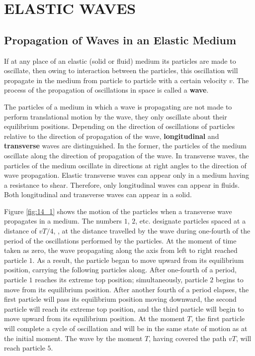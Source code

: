 

\chapter[ELASTIC WAVES]{ELASTIC WAVES}\label{chap:14}

\section{Propagation of Waves in an Elastic Medium}\label{sec:14_1}

If at any place of an elastic (solid or fluid) medium its particles are made to oscillate, then owing to interaction between the particles, this oscillation will propagate in the medium from particle to particle with a certain velocity $v$.
The process of the propagation of oscillations in space is called a \textbf{wave}.

The particles of a medium in which a wave is propagating are not made to perform translational motion by the wave, they only oscillate about their equilibrium positions.
Depending on the direction of oscillations of particles relative to the direction of propagation of the wave, \textbf{longitudinal} and \textbf{transverse} waves are distinguished.
In the former, the particles of the medium oscillate along the direction of propagation of the wave.
In transverse waves, the particles of the medium oscillate in directions at right angles to the direction of wave propagation.
Elastic transverse waves can appear only in a medium having a resistance to shear.
Therefore, only longitudinal waves can appear in fluids.
Both longitudinal and transverse waves can appear in a solid.

Figure \ref{fig:14_1} shows the motion of the particles when a transverse wave propagates in a medium.
The numbers $1$, $2$, etc. designate particles spaced at a distance of $vT/4$, \ie, at the distance travelled by the wave during one-fourth of the period of the oscillations performed by the particles.
At the moment of time taken as zero, the wave propagating along the axis from left to right reached particle $1$.
As a result, the particle began to move upward from its equilibrium position, carrying the following particles along.
After one-fourth of a period, particle $1$ reaches its extreme top position; simultaneously, particle $2$ begins to move from its equilibrium position.
After another fourth of a period elapses, the first particle will pass its equilibrium position moving downward, the second particle will reach its extreme top position, and the third particle will begin to move upward from its equilibrium position.
At the moment $T$, the first particle will complete a cycle of oscillation and will be in the same state of motion as at the initial moment.
The wave by the moment $T$, having covered the path $vT$, will reach particle $5$.

